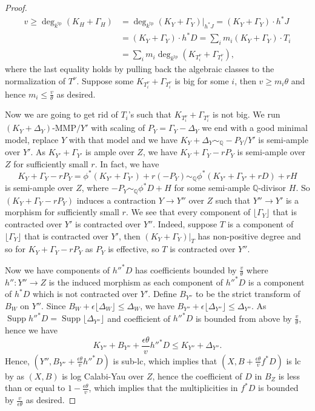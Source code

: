 \documentclass[letterpaper,reqno,12pt]{amsart}
\DeclareMathOperator{\Supp}{Supp}
\newcommand{\tp}{\mathrm{tp}}
\numberwithin{equation}{section}
\theoremstyle{plain}
\begin{document}
\begin{proof}
    \[\begin{aligned}
         v\geq\deg_{k^\tp}(K_H+\Gamma_H)&=\deg_{k^\tp}(K_Y+\Gamma_Y)|_{h^*J}=(K_Y+\Gamma_Y)\cdot h^*J\\&=(K_Y+\Gamma_Y)\cdot h^*D=\sum_im_i(K_Y+\Gamma_Y)\cdot T_i\\&=\sum_im_i\deg_{k^\tp}(K_{T_i^\nu}+\Gamma_{T_i^\nu}),
    \end{aligned}\]
    where the last equality holds by pulling back the algebraic classes to the normalization of $T^\nu$. Suppose some $K_{T_i^\nu}+\Gamma_{T_i^\nu}$ is big for some $i$, then $v\geq m_i\theta$ and hence $m_i\leq \frac{v}{\theta}$ as desired.

    Now we are going to get rid of $T_i$'s such that $K_{T_i^\nu}+\Gamma_{T_i^\nu}$ is not big. We run $(K_Y+\Delta_Y)$-MMP$/Y'$ with scaling of $P_Y=\Gamma_Y-\Delta_Y$ we end with a good minimal model, replace $Y$ with that model and we have $K_Y+\Delta_Y\sim_\mathbb Q-P_Y/Y'$ is semi-ample over $Y'$. As $K_{Y'}+\Gamma_{Y'}$ is ample over $Z$, we have $K_Y+\Gamma_Y-rP_Y$ is semi-ample over $Z$ for sufficiently small $r$. In fact, we have 
    \[K_Y+\Gamma_Y-rP_Y=\phi^*(K_{Y'}+\Gamma_{Y'})+r(-P_Y)\sim_\mathbb Q \phi^*(K_{Y'}+\Gamma_{Y'}+rD)+rH\]
    is semi-ample over $Z$, where $-P_Y\sim_\mathbb Q\phi^*D+H$ for some semi-ample $\mathbb Q$-divisor $H$. So $(K_Y+\Gamma_Y-rP_Y)$ induces a contraction $Y\to Y''$ over $Z$ such that $Y''\to Y'$ is a morphism for sufficiently small $r$. We see that every component of $\lfloor \Gamma_Y\rfloor$ that is contracted over $Y'$ is contracted over $Y''$. Indeed, suppose $T$ is a component of $\lfloor \Gamma_Y\rfloor$ that is contracted over $Y'$, then $(K_Y+\Gamma_Y)|_T$ has non-positive degree and so for $K_Y+\Gamma_Y-rP_Y$ as $P_Y$ is effective, so $T$ is contracted over $Y''$. 
    
    Now we have components of $h''^*D$ has coefficients bounded by $\frac{v}{\theta}$ where $h'':Y''\to Z$ is the induced morphism as each component of $h''^*D$ is a component of $h^*D$ which is not contracted over $Y'$. Define $B_{Y''}$ to be the strict transform of $B_W$ on $Y''$. Since $B_W+\epsilon\lfloor \Delta_W\rfloor\leq \Delta_W$, we have $B_{Y''}+\epsilon\lfloor\Delta_{Y''}\rfloor\leq \Delta_{Y''}$. As $\Supp h''^*D=\Supp\lfloor\Delta_{Y''}\rfloor$ and coefficient of $h''^*D$ is bounded from above by $\frac{v}{\theta}$, hence we have
    \[K_{Y''}+B_{Y''}+\frac{\epsilon\theta}{v}h''^*D\leq K_{Y''}+\Delta_{Y''}.\]
    Hence, $(Y'',B_{Y''}+\frac{\epsilon\theta}{v}h''^*D)$ is sub-lc, which implies that $(X,B+\frac{\epsilon\theta}{v}f^*D)$ is lc by  as $(X,B)$ is log Calabi-Yau over $Z$, hence the coefficient of $D$ in $B_Z$ is less than or equal to $1-\frac{\epsilon\theta}{v}$, which implies that the multiplicities in $f^*D$ is bounded by $\frac{v}{\epsilon\theta}$ as desired.
\end{proof}
\end{document}
